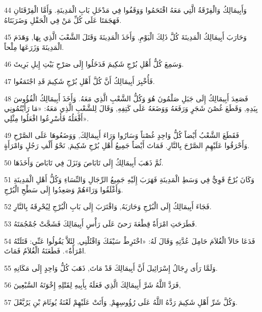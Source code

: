 \par 44 وَأَبِيمَالِكُ وَالْفِرْقَةُ الَّتِي مَعَهُ اقْتَحَمُوا وَوَقَفُوا فِي مَدْخَلِ بَابِ الْمَدِينَةِ. وَأَمَّا الْفِرْقَتَانِ فَهَجَمَتَا عَلَى كُلِّ مَنْ فِي الْحَقْلِ وَضَرَبَتَاهُ.
\par 45 وَحَارَبَ أَبِيمَالِكُ الْمَدِينَةَ كُلَّ ذَلِكَ الْيَوْمِ, وَأَخَذَ الْمَدِينَةَ وَقَتَلَ الشَّعْبَ الَّذِي بِهَا, وَهَدَمَ الْمَدِينَةَ وَزَرَعَهَا مِلْحاً.
\par 46 وَسَمِعَ كُلُّ أَهْلِ بُرْجِ شَكِيمَ فَدَخَلُوا إِلَى صَرْحِ بَيْتِ إِيلِ بَرِيثَ.
\par 47 فَأُخْبِرَ أَبِيمَالِكُ أَنَّ كُلَّ أَهْلِ بُرْجِ شَكِيمَ قَدِ اجْتَمَعُوا.
\par 48 فَصَعِدَ أَبِيمَالِكُ إِلَى جَبَلِ صَلْمُونَ هُوَ وَكُلُّ الشَّعْبِ الَّذِي مَعَهُ. وَأَخَذَ أَبِيمَالِكُ الْفُؤُوسَ بِيَدِهِ, وَقَطَعَ غُصْنَ شَجَرٍ وَرَفَعَهُ وَوَضَعَهُ عَلَى كَتِفِهِ, وَقَالَ لِلشَّعْبِ الَّذِي مَعَهُ: «مَا رَأَيْتُمُونِي أَفْعَلُهُ فَأَسْرِعُوا افْعَلُوا مِثْلِي».
\par 49 فَقَطَعَ الشَّعْبُ أَيْضاً كُلُّ وَاحِدٍ غُصْناً وَسَارُوا وَرَاءَ أَبِيمَالِكَ, وَوَضَعُوهَا عَلَى الصَّرْحِ وَأَحْرَقُوا عَلَيْهِمِ الصَّرْحَ بِالنَّارِ. فَمَاتَ أَيْضاً جَمِيعُ أَهْلِ بُرْجِ شَكِيمَ, نَحْوُ أَلْفِ رَجُلٍ وَامْرَأَةٍ.
\par 50 ثُمَّ ذَهَبَ أَبِيمَالِكُ إِلَى تَابَاصَ وَنَزَلَ فِي تَابَاصَ وَأَخَذَهَا.
\par 51 وَكَانَ بُرْجٌ قَوِيٌّ فِي وَسَطِ الْمَدِينَةِ فَهَرَبَ إِلَيْهِ جَمِيعُ الرِّجَالِ وَالنِّسَاءِ وَكُلُّ أَهْلِ الْمَدِينَةِ وَأَغْلَقُوا وَرَاءَهُمْ وَصَعِدُوا إِلَى سَطْحِ الْبُرْجِ.
\par 52 فَجَاءَ أَبِيمَالِكُ إِلَى الْبُرْجِ وَحَارَبَهُ, وَاقْتَرَبَ إِلَى بَابِ الْبُرْجِ لِيُحْرِقَهُ بِالنَّارِ.
\par 53 فَطَرَحَتِ امْرَأَةٌ قِطْعَةَ رَحىً عَلَى رَأْسِ أَبِيمَالِكَ فَشَجَّتْ جُمْجُمَتَهُ.
\par 54 فَدَعَا حَالاً الْغُلاَمَ حَامِلَ عُدَّتِهِ وَقَالَ لَهُ: «اخْتَرِطْ سَيْفَكَ وَاقْتُلْنِي, لِئَلاَّ يَقُولُوا عَنِّي: قَتَلَتْهُ امْرَأَةٌ». فَطَعَنَهُ الْغُلاَمُ فَمَاتَ.
\par 55 وَلَمَّا رَأَى رِجَالُ إِسْرَائِيلَ أَنَّ أَبِيمَالِكَ قَدْ مَاتَ, ذَهَبَ كُلُّ وَاحِدٍ إِلَى مَكَانِهِ.
\par 56 فَرَدَّ اللَّهُ شَرَّ أَبِيمَالِكَ الَّذِي فَعَلَهُ بِأَبِيهِ لِقَتْلِهِ إِخْوَتَهُ السَّبْعِينَ,
\par 57 وَكُلَّ شَرِّ أَهْلِ شَكِيمَ رَدَّهُ اللَّهُ عَلَى رُؤُوسِهِمْ, وَأَتَتْ عَلَيْهِمْ لَعْنَةُ يُوثَامَ بْنِ يَرُبَّعْلَ.

